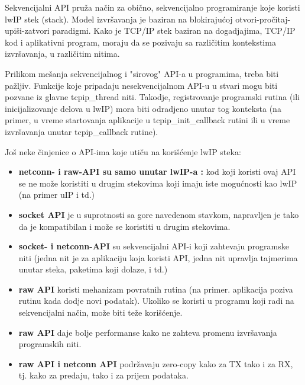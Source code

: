 \documentclass[a4paper,12pt, master]{etf}
\begin{document}
	Sekvencijalni API pru\v{z}a na\v{c}in za obi\v{c}no, sekvencijalno programiranje koje koristi lwIP stek
	(stack). Model izvr\v{s}avanja je baziran na blokiraju\'{c}oj
	otvori-pro\v{c}itaj-upi\v{s}i-zatvori paradigmi. Kako je TCP/IP stek baziran na dogadjajima,
	TCP/IP kod i aplikativni program, moraju da se pozivaju sa razli\v{c}itim kontekstima
	izvr\v{s}avanja, u razli\v{c}itim nitima.

	Prilikom me\v{s}anja sekvencijalnog i "sirovog" API-a u programima, treba biti pa\v{z}ljiv.
	Funkcije koje pripadaju nesekvencijalnom API-u u stvari mogu biti pozvane iz glavne
	tcpip\_thread niti.
	Takodje, registrovanje programski rutina (ili inicijalizovanje delova u lwIP) mora biti
	odradjeno unutar tog konteksta (na primer, u vreme startovanja aplikacije u
	tcpip\_init\_callback rutini ili u vreme izvr\v{s}avanja unutar tcpip\_callback rutine).

	Jo\v{s} neke \v{c}injenice o API-ima koje uti\v{c}u na kori\v{s}\'{c}enje lwIP steka:
	\begin{itemize}
		\item \textbf{netconn- i raw-API su samo unutar lwIP-a :} kod koji koristi ovaj API se
		ne mo\v{z}e koristiti u drugim stekovima koji imaju iste mogu\'{c}nosti kao lwIP (na primer
		uIP i td.)
		\item \textbf{socket API} je u suprotnosti sa gore navedenom stavkom, napravljen je
		tako da je kompatibilan i mo\v{z}e se koristiti u drugim stekovima.
		\item \textbf{socket- i netconn-API} su sekvencijalni API-i koji zahtevaju programske
		niti (jedna nit je za aplikaciju koja koristi API, jedna nit upravlja tajmerima unutar
		steka, paketima koji dolaze, i td.)
		\item \textbf{raw API} koristi mehanizam povratnih rutina (na primer\@. aplikacija poziva
		rutinu kada dodje novi podatak). Ukoliko se koristi u programu koji radi na
		sekvencijalni na\v{c}in, mo\v{z}e biti te\v{z}e kori\v{s}\'{c}enje.
		\item \textbf{raw API} daje bolje performanse kako ne zahteva promenu izvr\v{s}avanja
		programskih niti.
		\item \textbf{raw API i netconn API} podr\v{z}avaju zero-copy  kako
		za TX tako i za RX, tj\@. kako za predaju, tako i za prijem podataka.
	\end{itemize}
\end{document}
